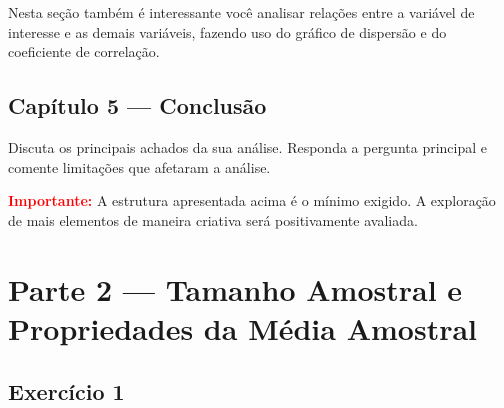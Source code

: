 \documentclass[12pt]{article}
\begin{document}
Nesta seção também é interessante você analisar relações entre a variável de interesse e as demais variáveis, fazendo uso do gráfico de dispersão e do coeficiente de correlação. 

\subsection*{Capítulo 5 — Conclusão}
Discuta os principais achados da sua análise. Responda a pergunta principal e comente limitações que afetaram a análise.

\textcolor{red}{\textbf{Importante:}} A estrutura apresentada acima é o mínimo exigido. A exploração de mais elementos de maneira criativa será positivamente avaliada.

\section*{Parte 2 — Tamanho Amostral e Propriedades da Média Amostral}

\subsection*{Exercício 1}
\end{document}

